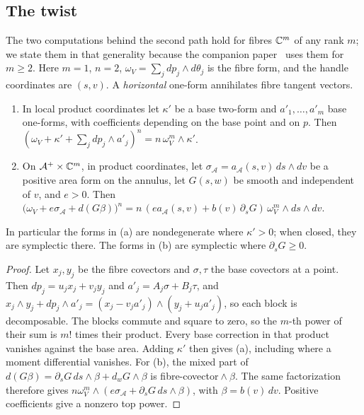 \subsection{The twist}\label{sec:hdl-twist}

The two computations behind the second path hold for fibres $\mathbb{C}^m$ of any rank $m$; we state them in that generality
because the companion paper~\cite{SongHD} uses them for $m\ge2$. Here $m=1$, $n=2$, $\omega_V=\sum_jdp_j\wedge d\theta_j$ is the fibre form, and the handle coordinates are $(s,v)$.
A \emph{horizontal} one-form annihilates fibre tangent vectors.

\begin{lemma}\label{lem:hdl-top-power}
\begin{enumerate}[label=(\alph*)]
\item In local product coordinates let $\kappa'$ be a base two-form and $a'_1,\dots,a'_m$ base one-forms, with
coefficients depending on the base point and on $p$. Then
$(\omega_V+\kappa'+\sum_jdp_j\wedge a'_j)^n=n\,\omega_V^m\wedge\kappa'$.
\item On $\mathcal A^+\times\mathbb{C}^m$, in product coordinates, let $\sigma_{\mathcal A}=a_{\mathcal A}(s,v)\,ds\wedge dv$ be a positive area form on the annulus, let $G(s,w)$ be smooth and
independent of $v$, and $e>0$. Then
$\big(\omega_V+e\sigma_{\mathcal A}+d(G\beta)\big)^n=n\,(e a_{\mathcal A}(s,v)+b(v)\,\partial_sG)\,\omega_V^m\wedge ds\wedge dv$.
\end{enumerate}
In particular the forms in (a) are nondegenerate where $\kappa'>0$; when closed, they are
symplectic there. The forms in (b) are symplectic where $\partial_sG\ge0$.
\end{lemma}

\begin{proof}
Let $x_j,y_j$ be the fibre covectors and $\sigma,\tau$ the base covectors at a point. Then $dp_j=u_jx_j+v_jy_j$ and $a'_j=A_j\sigma+B_j\tau$, and $x_j\wedge y_j+dp_j\wedge a'_j=(x_j-v_ja'_j)\wedge(y_j+u_ja'_j)$, so each block is decomposable. The blocks commute and square to zero, so the $m$-th power of their sum is $m!$ times their product. Every base correction in that product vanishes against the base area. Adding $\kappa'$ then gives (a), including where a moment differential vanishes. For (b), the mixed part of $d(G\beta)=\partial_sG\,ds\wedge\beta+d_wG\wedge\beta$ is fibre-covector${}\wedge\beta$. The same factorization therefore gives $n\omega_V^m\wedge(e\sigma_{\mathcal A}+\partial_sG\,ds\wedge\beta)$, with $\beta=b(v)\,dv$. Positive coefficients give a nonzero top power.
\end{proof}


